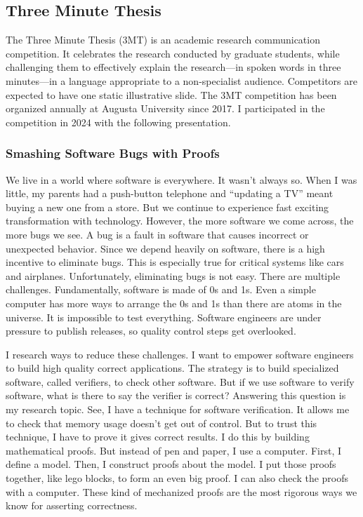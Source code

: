 \subsection{Three Minute Thesis}
\label{subsec:3mt}

The Three Minute Thesis (3MT) is an academic research communication competition.
It celebrates the research conducted by graduate students, while challenging them to effectively explain the research---in spoken words in three minutes---in a language appropriate to a non-specialist audience.
Competitors are expected to have one static illustrative slide.
The 3MT competition has been organized annually at Augusta University since 2017.
I participated in the competition in 2024 with the following presentation.


\subsubsection{Smashing Software Bugs with Proofs}

We live in a world where software is everywhere. It wasn’t always so. When I was little, my parents had a push-button telephone and “updating a TV” meant buying a new one from a store. But we continue to experience fast exciting transformation with technology. However, the more software we come across, the more bugs we see. A bug is a fault in software that causes incorrect or unexpected behavior. Since we depend heavily on software, there is a high incentive to eliminate bugs. This is especially true for critical systems like cars and airplanes. Unfortunately, eliminating bugs is not easy. There are multiple challenges. Fundamentally, software is made of 0s and 1s. Even a simple computer has more ways to arrange the 0s and 1s than there are atoms in the universe. It is impossible to test everything. Software engineers are under pressure to publish releases, so quality control steps get overlooked.

I research ways to reduce these challenges. I want to empower software engineers to build high quality correct applications. The strategy is to build specialized software, called verifiers, to check other software. But if we use software to verify software, what is there to say the verifier is correct? Answering this question is my research topic. See, I have a technique for software verification. It allows me to check that memory usage doesn’t get out of control. But to trust this technique, I have to prove it gives correct results. I do this by building mathematical proofs. But instead of pen and paper, I use a computer. First, I define a model. Then, I construct proofs about the model. I put those proofs together, like lego blocks, to form an even big proof. I can also check the proofs with a computer. These kind of mechanized proofs are the most rigorous ways we know for asserting correctness.

